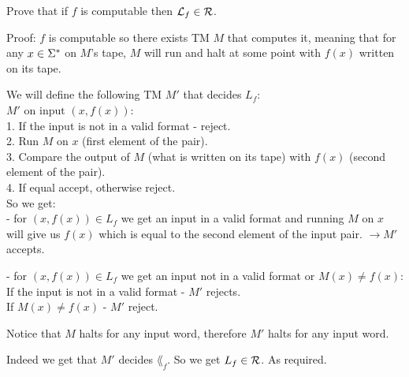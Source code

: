 Prove that if $f$ is computable then $\mathcal{L}_f \in \mathcal{R}$.

Proof:
$f$ is computable so there exists TM $M$ that computes it,
meaning that for any $x \in \Sigma^*$ on $M$'s tape, $M$ will run
and halt at some point with $f(x)$ written on its tape.

We will define the following TM $M'$ that decides $L_f$: \\

$M' \text{ on input }  (x, f(x))$: \\
1. If the input is not in a valid format - reject. \\
2. Run $M$ on $x$ (first element of the pair).  \\
3. Compare the output of $M$ (what is written on its tape)
with $f(x)$ (second element of the pair). \\
4. If equal accept, otherwise reject. \\

So we get: \\
- for $(x, f(x)) \in L_f$ we get an input in a valid format and running
$M$ on $x$ will give us $f(x)$ which is equal to the second element of the input pair.
$\rightarrow M'$ accepts.

- for $(x, f(x)) \in L_f$ we get an input not in a valid format or $M(x) \neq f(x)$: \\
If the input is not in a valid format - $M'$ rejects. \\
If $M(x) \neq f(x)$ - $M'$ reject.

Notice that $M$ halts for any input word, therefore $M'$ halts for any input word.

Indeed we get that $M'$ decides $\lang_f$. So we get $L_f \in \mathcal{R}$. As required. \\
